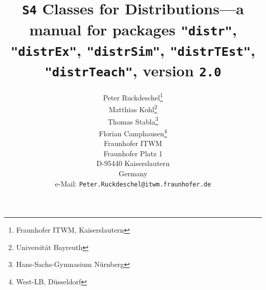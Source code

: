 \documentclass[11pt]{article}
\newcommand{\pkg}[1]{{\tt "#1"}}
\newcommand{\pkgversion}{{\tt 2.0}}
\newcommand{\pkgExversion}{{\tt 2.0}}
\begin{document}
\title{{\tt S4} Classes for Distributions---a manual for packages \pkg{distr}, 
        \pkg{distrEx}, \pkg{distrSim}, \pkg{distrTEst}, \pkg{distrTeach}, 
        version \pkgversion}
\author{\small Peter Ruckdeschel\thanks{Fraunhofer ITWM, Kaiserslautern}
\\[-.5ex]
\small Matthias Kohl\thanks{Universit\"at Bayreuth}
\\[-.5ex]
\small Thomas Stabla\thanks{Hans-Sachs-Gymnasium N\"urnberg}
\\[-.5ex]
\small Florian Camphausen\thanks{West-LB, D\"usseldorf}
\smallskip\\
\small Fraunhofer ITWM\\[-.5ex]
\small Fraunhofer Platz 1\\[-.5ex]
\small D-95440 Kaiserslautern\\[-.5ex]
\small Germany\\
\small e-Mail: {\small \tt Peter.Ruckdeschel@itwm.fraunhofer.de}\\
}
\maketitle
\end{document}

